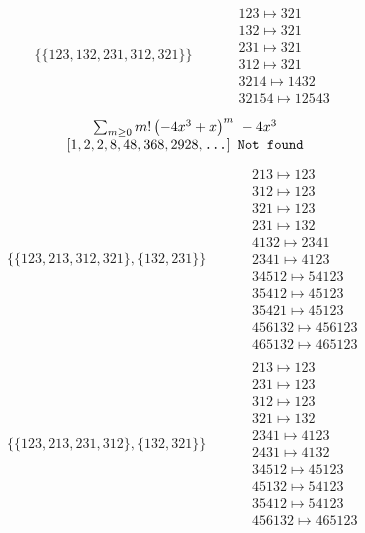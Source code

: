 \begin{tiny}
\begin{align}
\begin{matrix}
\end{matrix}
\\
\{\{123, 132, 231, 312, 321\}\}
\quad
&
\phantom{.}
&
\begin{matrix}
123 \mapsto 321\\132 \mapsto 321\\231 \mapsto 321\\312 \mapsto 321\\3214 \mapsto 1432\\32154 \mapsto 12543
\end{matrix}
\end{align}
$$
\begin{matrix}
\sum_{m \geq 0} m! \left(
-4 x^{3} + x
\right)^m
\ 
-4 x^{3}
\\
\left[1, 2, 2, 8, 48, 368, 2928, \text{\texttt{...}}\right]
\ 
\texttt{Not found}
\end{matrix}
$$
\vspace{-1em}
\begin{align}
\{\{123, 213, 312, 321\}, \{132, 231\}\}
\quad
&
\phantom{.}
&
\begin{matrix}
213 \mapsto 123\\312 \mapsto 123\\321 \mapsto 123\\231 \mapsto 132\\4132 \mapsto 2341\\2341 \mapsto 4123\\34512 \mapsto 54123\\35412 \mapsto 45123\\35421 \mapsto 45123\\456132 \mapsto 456123\\465132 \mapsto 465123
\end{matrix}
\\
\{\{123, 213, 231, 312\}, \{132, 321\}\}
\quad
&
\phantom{.}
&
\begin{matrix}
213 \mapsto 123\\231 \mapsto 123\\312 \mapsto 123\\321 \mapsto 132\\2341 \mapsto 4123\\2431 \mapsto 4132\\34512 \mapsto 45123\\45132 \mapsto 54123\\35412 \mapsto 54123\\456132 \mapsto 465123
\end{matrix}
\\

\end{align}
\end{tiny}
